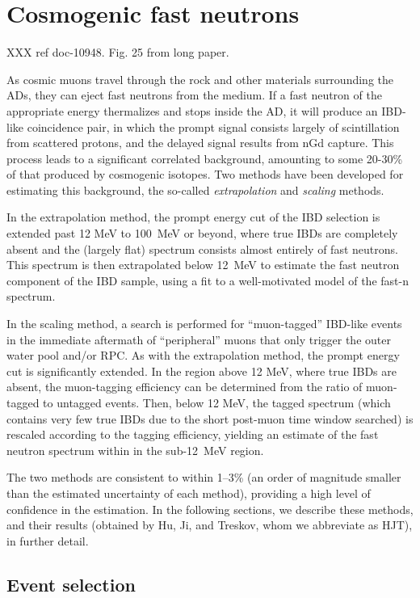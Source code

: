 \documentclass[../thesis.tex]{subfiles}
\begin{document}
\section{Cosmogenic fast neutrons}

XXX ref doc-10948. Fig. 25 from long paper.

As cosmic muons travel through the rock and other materials surrounding the ADs, they can eject fast neutrons from the medium. If a fast neutron of the appropriate energy thermalizes and stops inside the AD, it will produce an IBD-like coincidence pair, in which the prompt signal consists largely of scintillation from scattered protons, and the delayed signal results from nGd capture. This process leads to a significant correlated background, amounting to some 20-30\% of that produced by cosmogenic isotopes. Two methods have been developed for estimating this background, the so-called \emph{extrapolation} and \emph{scaling} methods.

In the extrapolation method, the prompt energy cut of the IBD selection is extended past 12 MeV to 100~MeV or beyond, where true IBDs are completely absent and the (largely flat) spectrum consists almost entirely of fast neutrons. This spectrum is then extrapolated below 12~MeV to estimate the fast neutron component of the IBD sample, using a fit to a well-motivated model of the fast-n spectrum.

In the scaling method, a search is performed for ``muon-tagged'' IBD-like events in the immediate aftermath of ``peripheral'' muons that only trigger the outer water pool and/or RPC. As with the extrapolation method, the prompt energy cut is significantly extended. In the region above 12 MeV, where true IBDs are absent, the muon-tagging efficiency can be determined from the ratio of muon-tagged to untagged events. Then, below 12 MeV, the tagged spectrum (which contains very few true IBDs due to the short post-muon time window searched) is rescaled according to the tagging efficiency, yielding an estimate of the fast neutron spectrum within in the sub-12~MeV region.

The two methods are consistent to within 1--3\% (an order of magnitude smaller than the estimated uncertainty of each method), providing a high level of confidence in the estimation. In the following sections, we describe these methods, and their results (obtained by Hu, Ji, and Treskov, whom we abbreviate as HJT), in further detail.

\subsection{Event selection}
\label{sec:fastn_sel}
\end{document}
